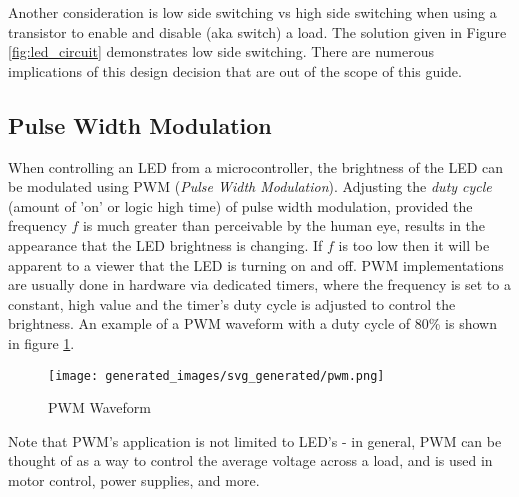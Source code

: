 \documentclass[main.tex]{subfiles}
\begin{document}
Another consideration is low side switching vs high side switching when using a transistor to enable and disable (aka switch) a load. The solution given in Figure \ref{fig:led_circuit} demonstrates low side switching. There are numerous implications of this design decision that are out of the scope of this guide.

\subsection{Pulse Width Modulation}
When controlling an LED from a microcontroller, the brightness of the LED can be modulated using PWM (\textit{Pulse Width Modulation}). Adjusting the \textit{duty cycle} (amount of 'on' or logic high time) of pulse width modulation, provided the frequency $f$ is much greater than perceivable by the human eye, results in the appearance that the LED brightness is changing. If $f$ is too low then it will be apparent to a viewer that the LED is turning on and off. PWM implementations are usually done in hardware via dedicated timers, where the frequency is set to a constant, high value and the timer's duty cycle is adjusted to control the brightness. An example of a PWM waveform with a duty cycle of 80\% is shown in figure \ref{fig:pwm_waveform}.

\begin{figure}[H]
    \centering
    \texttt{[image: generated\_images/svg\_generated/pwm.png]}
    \caption{PWM Waveform}
    \label{fig:pwm_waveform}
\end{figure}

\noindent Note that PWM's application is not limited to LED's - in general, PWM can be thought of as a way to control the average voltage across a load, and is used in motor control, power supplies, and more.
\end{document}
